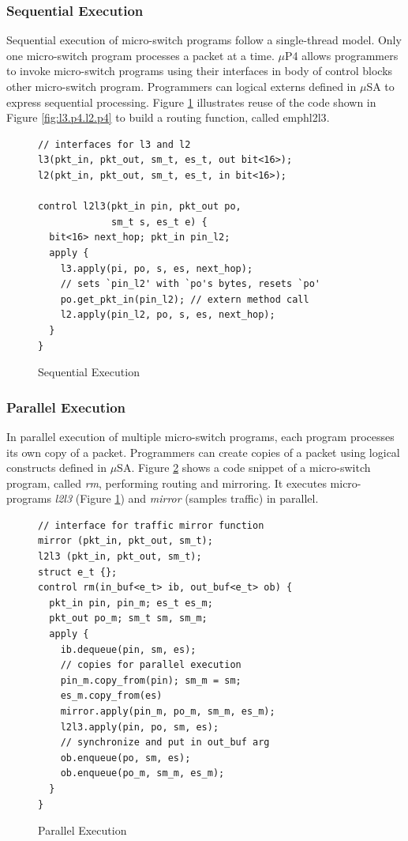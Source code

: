 \documentclass{hotnets19}
\begin{document}
\subsubsection{Sequential Execution}
\label{subsubsection:sequential-execution}
Sequential execution of micro-switch programs follow a single-thread model.
Only one micro-switch program processes a packet at a time.
$\mu$P4 allows programmers to invoke micro-switch programs using their interfaces in body of control blocks other micro-switch program.
Programmers can logical externs defined in $\mu$SA to express sequential processing.
Figure \ref{fig:sequential-execution} illustrates reuse of the code shown in Figure \ref{fig:l3.p4.l2.p4} to build a routing function, called emph{l2l3}.
 \begin{figure}[ht]
\begin{lstlisting}[frame=none]
// interfaces for l3 and l2
l3(pkt_in, pkt_out, sm_t, es_t, out bit<16>);
l2(pkt_in, pkt_out, sm_t, es_t, in bit<16>);

control l2l3(pkt_in pin, pkt_out po, 
             sm_t s, es_t e) {
  bit<16> next_hop; pkt_in pin_l2;
  apply {
    l3.apply(pi, po, s, es, next_hop);
    // sets `pin_l2' with `po's bytes, resets `po'
    po.get_pkt_in(pin_l2); // extern method call
    l2.apply(pin_l2, po, s, es, next_hop);
  }
}
\end{lstlisting}
\caption{Sequential Execution}
\label{fig:sequential-execution}
\end{figure}

\subsubsection{Parallel Execution}
\label{subsubsection:parallel-execution}
In parallel execution of multiple micro-switch programs, each program processes its own copy of a packet.
Programmers can create copies of a packet using logical constructs defined in $\mu$SA.
Figure \ref{fig:parallel-execution} shows a code snippet of a micro-switch program, called \emph{rm}, performing routing and mirroring.
It executes micro-programs \emph{l2l3} (Figure \ref{fig:sequential-execution}) and \emph{mirror} (samples traffic) in parallel.
\begin{figure}[ht]
\begin{lstlisting}[frame=none]
// interface for traffic mirror function
mirror (pkt_in, pkt_out, sm_t);
l2l3 (pkt_in, pkt_out, sm_t);
struct e_t {};
control rm(in_buf<e_t> ib, out_buf<e_t> ob) {
  pkt_in pin, pin_m; es_t es_m;
  pkt_out po_m; sm_t sm, sm_m;
  apply {
    ib.dequeue(pin, sm, es);
    // copies for parallel execution
    pin_m.copy_from(pin); sm_m = sm; 
    es_m.copy_from(es)
    mirror.apply(pin_m, po_m, sm_m, es_m);
    l2l3.apply(pin, po, sm, es);
    // synchronize and put in out_buf arg
    ob.enqueue(po, sm, es);
    ob.enqueue(po_m, sm_m, es_m);
  }
}
\end{lstlisting}
\caption{Parallel Execution}
\label{fig:parallel-execution}
\end{figure}
\end{document}

